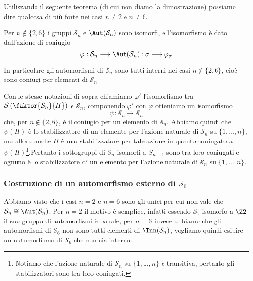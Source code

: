\documentclass[11pt]{scrartcl}
\begin{document}
Utilizzando il seguente teorema (di cui non diamo la dimostrazione) possiamo
dire qualcosa di più forte nei casi $n \neq 2$ e $n \neq 6$.

\begin{theorem}
    Per $n \notin \{2, 6\}$ i gruppi $\mathcal{S}_n$ e $\Aut(\mathcal{S}_n)$ sono isomorfi, e 
    l'isomorfismo è dato dall'azione di coniugio
    \[
        \varphi: \mathcal{S}_n \longrightarrow \Aut(\mathcal{S}_n): \sigma \longmapsto \varphi_{\sigma}
    \]
\end{theorem}

\begin{remark}
    In particolare gli automorfismi di $\mathcal{S}_n$ sono tutti interni nei casi $n \notin \{2, 6\}$,
    cioè sono coniugi per elementi di $\mathcal{S}_n$
\end{remark}

Con le stesse notazioni di sopra chiamiamo $\varphi'$ l'isomorfismo tra
$\mathcal{S}\left(\faktor{\mathcal{S}_n}{H}\right)$ e $\mathcal{S}_n$, componendo $\varphi'$ con $\varphi$ 
otteniamo un isomorfismo
\[
    \psi :\mathcal{S}_n \longrightarrow \mathcal{S}_n
\]
che, per $n \notin \{2, 6\}$, è il coniugio per un elemento di $\mathcal{S}_n$. Abbiamo
quindi che $\psi(H)$ è lo stabilizzatore di un elemento per l'azione naturale
di $\mathcal{S}_n$ su $\{1, \ldots, n\}$, ma allora anche $H$ è uno stabilizzatore per tale
azione in quanto coniugato a $\psi(H)$\footnote{
    Notiamo che l'azione naturale di $\mathcal{S}_n$ su $\{1, \ldots, n\}$ è transitiva,
    pertanto gli stabilizzatori sono tra loro coniugati.
}.Pertanto i sottogruppi di $\mathcal{S}_n$ isomorfi a $S_{n - 1}$ sono tra loro coniugati
e ognuno è lo stabilizzatore di un elemento per l'azione naturale di $\mathcal{S}_n$
su $\{1, \ldots, n\}$.

\subsubsection{Costruzione di un automorfismo esterno di $\mathcal{S}_6$}

Abbiamo visto che i casi $n = 2$ e $n = 6$ sono gli unici per cui non vale 
che $\mathcal{S}_n \cong \Aut(\mathcal{S}_n)$. Per $n = 2$ il motivo è semplice, infatti essendo
$\mathcal{S}_2$ isomorfo a $\Z2$ il suo gruppo di automorfismi è banale, per $n = 6$
invece abbiamo che gli automorfismi di $\mathcal{S}_6$ non sono tutti elementi di $\Inn(\mathcal{S}_n)$,
vogliamo quindi esibire un automorfismo di $\mathcal{S}_6$ che non sia interno.\newline
\end{document}
